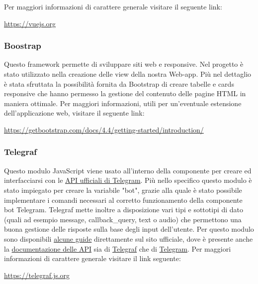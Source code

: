 			\newline
			Per maggiori informazioni di carattere generale visitare il seguente link:
			\newline
			\begin{center}
				\url{https://vuejs.org}
			\end{center}
		\subsubsection{Boostrap}
			Questo framework permette di sviluppare siti web e  responsive. Nel progetto è stato utilizzato nella creazione delle view della nostra Web-app.
			Più nel dettaglio è stata sfruttata la possibilità fornita da Bootstrap di creare tabelle e cards responsive che hanno permesso la gestione del contenuto delle pagine HTML in maniera ottimale.
			\newline
			Per maggiori informazioni, utili per un'eventuale estensione dell'applicazione web, visitare il seguente link:
			\newline
			\begin{center}
				\url{https://getbootstrap.com/docs/4.4/getting-started/introduction/}
			\end{center}	
		\subsubsection{Telegraf}
			Questo modulo JavaScript viene usato all'interno della componente  per creare ed interfacciarsi con le \href{https://core.telegram.org/bots/api}{API ufficiali di Telegram}.
			Più nello specifico questo modulo è stato impiegato per creare la variabile "bot", grazie alla quale è stato possibile implementare i comandi necessari al corretto funzionamento della componente bot Telegram.
			Telegraf mette inoltre a disposizione vari tipi e sottotipi di dato (quali ad esempio message, callback_query, text o audio) che permettono una buona gestione delle risposte sulla base degli input dell'utente. Per questo modulo sono disponibili \href{https://telegraf.js.org/#/?id=getting-started}{alcune guide} direttamente sul sito ufficiale, dove è presente anche la \href{https://telegraf.js.org/#/?id=api-reference}{documentazione delle API} sia di \href{https://telegraf.js.org/#/?id=telegraf}{Telegraf} che di \href{https://telegraf.js.org/#/?id=telegram}{Telegram}.
			\newline
			Per maggiori informazioni di carattere generale visitare il link seguente:
			\newline
			\begin{center}
				\url{https://telegraf.js.org}
			\end{center}
	